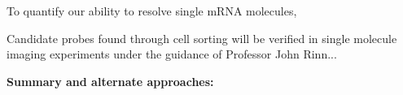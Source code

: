 To quantify our ability to resolve single mRNA molecules,

Candidate probes found through cell sorting will be verified in single molecule imaging experiments under the guidance of Professor John Rinn... 

\textbf{Summary and alternate approaches:}

